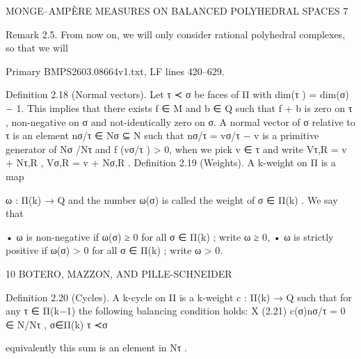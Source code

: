 \documentclass[
  11pt,
]{article}
\newenvironment{Shaded}{}{}
\newcommand{\NormalTok}[1]{#1}
\begin{document}
\begin{Shaded}
\begin{Highlighting}[]
\NormalTok{                   MONGE–AMPÈRE MEASURES ON BALANCED POLYHEDRAL SPACES                                  7}


\NormalTok{Remark 2.5. From now on, we will only consider rational polyhedral complexes, so that we will}
\end{Highlighting}
\end{Shaded}

Primary BMPS2603.08664v1.txt, LF lines 420--629.

\begin{Shaded}
\begin{Highlighting}[]
\NormalTok{Definition 2.18 (Normal vectors). Let τ ≺ σ be faces of Π with dim(τ ) = dim(σ) − 1. This}
\NormalTok{implies that there exists f ∈ M and b ∈ Q such that f + b is zero on τ , non{-}negative on σ and}
\NormalTok{not{-}identically zero on σ. A normal vector of σ relative to τ is an element}
\NormalTok{                                                 nσ/τ ∈ Nσ ⊆ N}
\NormalTok{such that nσ/τ = vσ/τ − v is a primitive generator of Nσ /Nτ and f (vσ/τ ) \textgreater{} 0, when we pick v ∈ τ}
\NormalTok{and write Vτ,R = v + Nτ,R , Vσ,R = v + Nσ,R .}
\NormalTok{Definition 2.19 (Weights). A k{-}weight on Π is a map}

\NormalTok{                                                   ω : Π(k) → Q}
\NormalTok{and the number ω(σ) is called the weight of σ ∈ Π(k) . We say that}

\NormalTok{      • ω is non{-}negative if ω(σ) ≥ 0 for all σ ∈ Π(k) ; write ω ≥ 0,}
\NormalTok{      • ω is strictly positive if ω(σ) \textgreater{} 0 for all σ ∈ Π(k) ; write ω \textgreater{} 0.}

\NormalTok{10                             BOTERO, MAZZON, AND PILLE{-}SCHNEIDER}


\NormalTok{Definition 2.20 (Cycles). A k{-}cycle on Π is a k{-}weight c : Π(k) → Q such that for any τ ∈ Π(k−1)}
\NormalTok{the following balancing condition holds:}
\NormalTok{                                    X}
\NormalTok{(2.21)                                   c(σ)nσ/τ = 0 ∈ N/Nτ ,}
\NormalTok{                                    σ∈Π(k)}
\NormalTok{                                     τ ≺σ}

\NormalTok{equivalently this sum is an element in Nτ .}


\end{Highlighting}
\end{Shaded}
\end{document}
